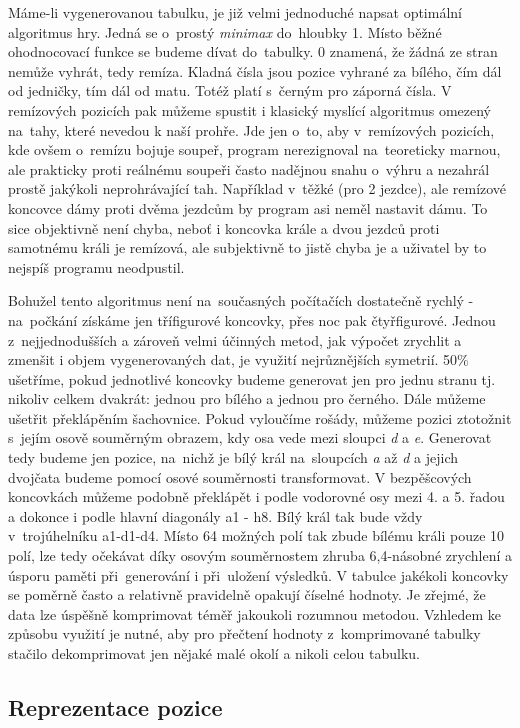\documentclass[11pt, titlepage]{article}
\begin{document}
Máme-li vygenerovanou tabulku, je již velmi jednoduché napsat optimální algoritmus hry. Jedná se o~prostý {\it minimax} do~hloubky 1. Místo běžné ohodnocovací funkce se budeme dívat do~tabulky. 0 znamená, že žádná ze stran nemůže vyhrát, tedy remíza. Kladná čísla jsou pozice vyhrané za bílého, čím dál od jedničky, tím dál od matu. Totéž platí s~černým pro záporná čísla. V remízových pozicích pak můžeme spustit i klasický myslící algoritmus omezený na~tahy, které nevedou k naší prohře. Jde jen o~to, aby v~remízových pozicích, kde ovšem o~remízu bojuje soupeř, program nerezignoval na~teoreticky marnou, ale prakticky proti reálnému soupeři často nadějnou snahu o~výhru a nezahrál prostě jakýkoli neprohrávající tah. Například v~těžké (pro 2 jezdce), ale remízové koncovce dámy proti dvěma jezdcům by program asi neměl nastavit dámu. To sice objektivně není chyba, neboť i koncovka krále a dvou jezdců proti samotnému králi je remízová, ale subjektivně to jistě chyba je a uživatel by to nejspíš programu neodpustil.

Bohužel tento algoritmus není na~současných počítačích dostatečně rychlý - na~počkání získáme jen třífigurové koncovky, přes noc pak čtyřfigurové. Jednou z~nejjednodušších a zároveň velmi účinných metod, jak výpočet zrychlit a zmenšit i objem vygenerovaných dat, je využití nejrůznějších symetrií. 50\% ušetříme, pokud jednotlivé koncovky budeme generovat jen pro jednu stranu tj. nikoliv celkem dvakrát: jednou pro bílého a jednou pro černého. Dále můžeme ušetřit překlápěním šachovnice. Pokud vyloučíme rošády, můžeme pozici ztotožnit s~jejím osově souměrným obrazem, kdy osa vede mezi sloupci {\it d} a {\it e}. Generovat tedy budeme jen pozice, na~nichž je bílý král na~sloupcích {\it a} až {\it d} a jejich dvojčata budeme pomocí osové souměrnosti transformovat. V bezpěšcových koncovkách můžeme podobně překlápět i podle vodorovné osy mezi 4. a 5. řadou a dokonce i podle hlavní diagonály a1 - h8. Bílý král tak bude vždy v~trojúhelníku a1-d1-d4. Místo 64 možných polí tak zbude bílému králi pouze 10 polí, lze tedy očekávat díky osovým souměrnostem zhruba 6,4-násobné zrychlení a úsporu paměti při~generování i při~uložení výsledků.
V tabulce jakékoli koncovky se poměrně často a relativně pravidelně opakují číselné hodnoty. Je zřejmé, že data lze úspěšně komprimovat téměř jakoukoli rozumnou metodou. Vzhledem ke způsobu využití je nutné, aby pro přečtení hodnoty z~komprimované tabulky stačilo dekomprimovat jen nějaké malé okolí a nikoli celou tabulku.

\subsection{Reprezentace pozice}
\end{document}
